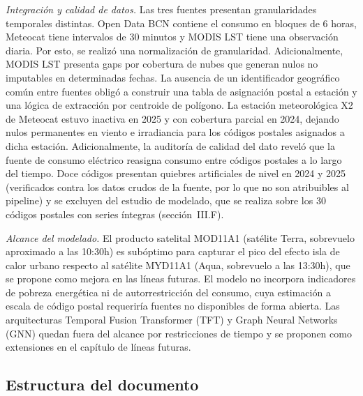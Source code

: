 \documentclass[12pt, a4paper]{article}
\begin{document}
\textit{Integración y calidad de datos.} Las tres fuentes presentan granularidades temporales distintas. Open Data BCN contiene el consumo en bloques de 6 horas, Meteocat tiene intervalos de 30 minutos y MODIS LST tiene una observación diaria. Por esto, se realizó una normalización de granularidad. Adicionalmente, MODIS LST presenta gaps por cobertura de nubes que generan nulos no imputables en determinadas fechas. La ausencia de un identificador geográfico común entre fuentes obligó a construir una tabla de asignación postal a estación y una lógica de extracción por centroide de polígono. La estación meteorológica X2 de Meteocat estuvo inactiva en 2025 y con cobertura parcial en 2024, dejando nulos permanentes en viento e irradiancia para los códigos postales asignados a dicha estación. Adicionalmente, la auditoría de calidad del dato reveló que la fuente de consumo eléctrico reasigna consumo entre códigos postales a lo largo del tiempo. Doce códigos presentan quiebres artificiales de nivel en 2024 y 2025 (verificados contra los datos crudos de la fuente, por lo que no son atribuibles al pipeline) y se excluyen del estudio de modelado, que se realiza sobre los 30 códigos postales con series íntegras (sección~III.F).

\textit{Alcance del modelado.} El producto satelital MOD11A1 (satélite Terra, sobrevuelo aproximado a las 10:30h) es subóptimo para capturar el pico del efecto isla de calor urbano respecto al satélite MYD11A1 (Aqua, sobrevuelo a las 13:30h), que se propone como mejora en las líneas futuras. El modelo no incorpora indicadores de pobreza energética ni de autorrestricción del consumo, cuya estimación a escala de código postal requeriría fuentes no disponibles de forma abierta. Las arquitecturas Temporal Fusion Transformer (TFT) y Graph Neural Networks (GNN) quedan fuera del alcance por restricciones de tiempo y se proponen como extensiones en el capítulo de líneas futuras.

\subsection{Estructura del documento}
\end{document}
